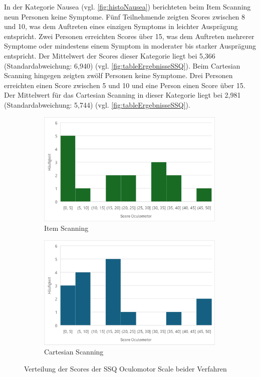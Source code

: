 In der Kategorie Nausea (vgl. \autoref{fig:histoNausea}) berichteten beim Item Scanning neun Personen keine Symptome. Fünf Teilnehmende zeigten Scores zwischen 8 und 10, was dem Auftreten eines einzigen Symptoms in leichter Ausprägung entspricht. Zwei Personen erreichten Scores über 15, was dem Auftreten mehrerer Symptome oder mindestens einem Symptom in moderater bis starker Ausprägung entspricht. Der Mittelwert der Scores dieser Kategorie liegt bei 5,366 (Standardabweichung: 6,940) (vgl. \autoref{fig:tableErgebnisseSSQ}). Beim Cartesian Scanning hingegen zeigten zwölf Personen keine Symptome. Drei Personen erreichten einen Score zwischen 5 und 10 und eine Person einen Score über 15. Der Mittelwert für das Cartesian Scanning in dieser Kategorie liegt bei 2,981 (Standardabweichung: 5,744) (vgl. \autoref{fig:tableErgebnisseSSQ}).

\begin{figure}
    \centering
    \begin{subfigure}{.5\textwidth}
        \centering
        \includegraphics[width=0.99\textwidth]{images/Results/Histogramm-Oculomotor-Scale-Item.png}
        \caption{Item Scanning}
        \label{fig:histoOculomotorItem}   
    \end{subfigure}%
    \begin{subfigure}{.5\textwidth}
        \centering
        \includegraphics[width=0.99\textwidth]{images/Results/Histogramm-Oculomotor-Scale-Cartesian.png}
         \caption{Cartesian Scanning}
         \label{fig:histoOculomotorCartesian}
    \end{subfigure}
    \caption{Verteilung der Scores der SSQ Oculomotor Scale beider Verfahren}
    \label{fig:histoOculomotor}
\end{figure}

